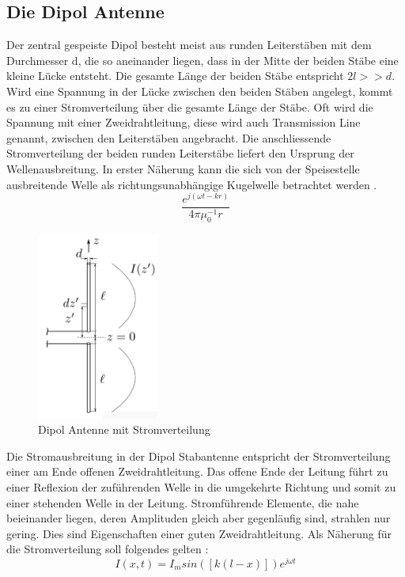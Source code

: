 \subsection{Die Dipol Antenne}\label{sec:DipolAntenne}
Der zentral gespeiste Dipol besteht meist aus runden Leiterstäben mit dem Durchmesser d, die so aneinander liegen, dass in der Mitte der beiden Stäbe eine kleine Lücke entsteht. Die gesamte Länge der beiden Stäbe entspricht $2l>>d$. Wird eine Spannung  in der Lücke zwischen den beiden Stäben angelegt, kommt es zu einer Stromverteilung über die gesamte Länge der  Stäbe. Oft wird die Spannung mit einer Zweidrahtleitung,  diese wird auch Transmission Line genannt, zwischen den Leiterstäben angebracht. Die anschliessende Stromverteilung der beiden runden Leiterstäbe liefert den Ursprung der Wellenausbreitung. In erster Näherung kann die sich von der Speisestelle ausbreitende Welle als richtungsunabhängige Kugelwelle betrachtet werden \cite{elliott1981antenna}.
\begin{equation}
\frac{e^{j(\omega t-kr)}}{4\pi \mu_{0}^{-1}r}
\end{equation}

\begin{figure}[!htb]
	\centering
	\includegraphics[width=4cm]{content/bilder/Dipol_EMANT_S42.pdf}%
	\caption{Dipol Antenne mit Stromverteilung \cite{Tekom}}
	\label{FitzDipol}
\end{figure}

Die Stromausbreitung in der Dipol Stabantenne entspricht der Stromverteilung einer am Ende offenen Zweidrahtleitung. Das offene Ende der Leitung führt zu einer Reflexion der zuführenden Welle in die umgekehrte Richtung und somit zu einer stehenden Welle in der Leitung. Stromführende Elemente, die nahe beieinander liegen, deren Amplituden gleich aber gegenläufig sind, strahlen nur gering. Dies sind   Eigenschaften einer guten Zweidrahtleitung.
Als Näherung für die Stromverteilung soll folgendes gelten \cite{elliott1981antenna}:
\begin{equation}
I(x,t) =I_{m}sin([k(l-x)])e^{j\omega t}
\end{equation}

